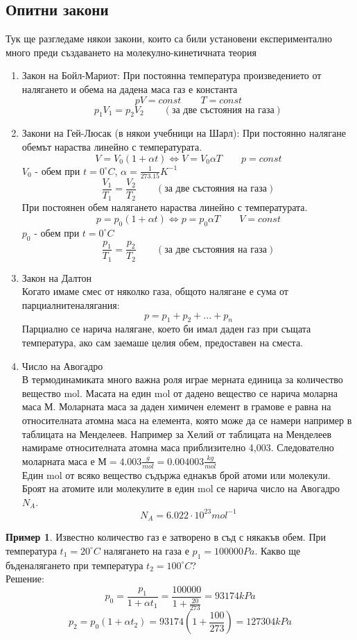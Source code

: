 \documentclass[fleqn, 12pt]{article}
\theoremstyle{definition}
\newtheorem{example}{Пример}[subsection]
\begin{document}
\subsection{Опитни закони}
Тук ще разгледаме някои закони, които са били установени експериментално много преди създаването на молекулно-кинетичната теория 
\begin{enumerate}
\item Закон на Бойл-Мариот: При постоянна температура произведението от налягането и обема на дадена маса газ е константа 
$$pV = const \qquad T = const$$
$$p_1V_1 = p_2V_2 \qquad (\text{за две състояния на газа})$$
\item Закони на Гей-Люсак (в някои учебници на Шарл): При постоянно налягане обемът нараства линейно с температурата.
$$V = V_0(1 + \alpha t) \Leftrightarrow V = V_0 \alpha T \qquad p = const$$
$V_0$ - обем при $t = 0^\circ C$, $\alpha = \frac{1}{273.15}K^{-1}$
$$\frac{V_1}{T_1} = \frac{V_2}{T_2}  \qquad (\text{за две състояния на газа}) $$
При постоянен обем налягането нараства линейно с температурата.
$$p = p_0(1 + \alpha t) \Leftrightarrow p = p_0 \alpha T \qquad V = const$$
$p_0$ - обем при $t = 0^\circ C$
$$\frac{p_1}{T_1} = \frac{p_2}{T_2}  \qquad (\text{за две състояния на газа}) $$
\item Закон на Далтон\\
Когато имаме смес от няколко газа, общото налягане е сума от парциалнитеналягания:
$$p = p_1 + p_2 + ... + p_n$$
Парциално се нарича налягане, което би имал
даден газ при същата температура, ако сам заемаше целия обем, предоставен на сместа.
\item Число на Авогадро\\
В термодинамиката много важна роля играе мерната единица за количество
вещество mol. Масата на един mol от дадено вещество се нарича моларна маса М.
Моларната маса за даден химичен елемент в грамове е равна на относителната атомна
маса на елемента, която може да се намери например в таблицата на Менделеев.
Например за Хелий от таблицата на Менделеев намираме относителната атомна маса
приблизително 4,003. Следователно моларната маса е
$М = 4.003 \frac{g}{mol} = 0.004003 \frac{kg}{mol}$ \\
Един mol от всяко вещество съдържа еднакъв брой атоми или молекули. Броят
на атомите или молекулите в един mol се нарича число на Авогадро $N_A$.
$$N_A = 6.022 \cdot 10^{23} mol^{-1}$$
\end{enumerate}

\begin{example}
Известно количество газ е затворено в съд с някакъв обем. При температура $t_1 = 20^\circ C$
налягането на газа е $ p_1 = 100000 Pa $. Какво ще бъденалягането при температура $t_2 = 100^\circ C$?\\
Решение: \\
$$p_0 = \frac{p_1}{1 + \alpha t_1} = \frac{100000}{1 + \frac{20}{273}} = 93174 kPa$$
$$p_2 =p_0(1 + \alpha t_2) = 93174 (1 + \frac{100}{273}) = 127304 kPa$$
\end{example}
\end{document}
